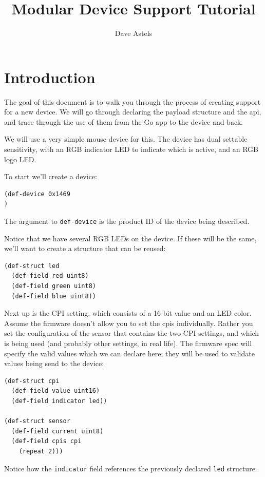 \documentclass[12pt]{article}
\title{\SSEnext Modular Device Support Tutorial}
\author{Dave Astels}
\begin{document}
\maketitle

\section{Introduction}

The goal of this document is to walk you through the process of
creating support for a new device. We will go through declaring the
payload structure and the api, and trace through the use of them from
the Go app to the device and back.

We will use a very simple mouse device for this. The device has dual
settable sensitivity, with an RGB indicator LED to indicate which is active, and
an RGB logo LED.

To start we'll create a device:

\begin{verbatim}
(def-device 0x1469
)
\end{verbatim}

The argument to \verb|def-device| is the product ID of the device
being described.

Notice that we have several RGB LEDs on the device.  If these will be
the same, we'll want to create a structure that can be reused:

\begin{verbatim}
(def-struct led
  (def-field red uint8)
  (def-field green uint8)
  (def-field blue uint8))
\end{verbatim}

Next up is the CPI setting, which consists of a 16-bit value and an
LED color. Assume the firmware doesn't allow you to set the cpis
individually. Rather you set the configuration of the sensor that
contains the two CPI settings, and which is being used (and probably other settings, in real
life). The firmware spec will specify the valid values which we can
declare here; they will be used to validate values being send to the
device:

\begin{verbatim}
(def-struct cpi
  (def-field value uint16)
  (def-field indicator led))

(def-struct sensor
  (def-field current uint8)
  (def-field cpis cpi
    (repeat 2)))
\end{verbatim}

Notice how the \verb|indicator| field references the previously declared
\verb|led| structure.
\end{document}
